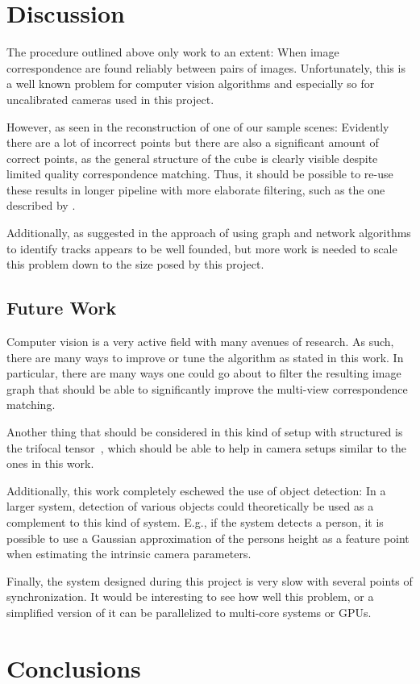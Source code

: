 \documentclass[preprint,acmtog]{acmart}
\begin{document}
\section{Discussion}

The procedure outlined above only work to an extent: When image correspondence
are found reliably between pairs of images. Unfortunately, this is a well known
problem for computer vision algorithms and especially so for uncalibrated
cameras used in this project.

However, as seen in the reconstruction of one of our sample scenes: Evidently
there are a lot of incorrect points but there are also a significant amount of
correct points, as the general structure of the cube is clearly visible despite
limited quality correspondence matching. Thus, it should be possible to re-use
these results in longer pipeline with more elaborate filtering, such as the one
described by \cite{ftc2016}.

Additionally, as suggested in \cite{wilson_iccv2013_disambig} the approach of
using graph and network algorithms to identify tracks appears to be well
founded, but more work is needed to scale this problem down to the size posed by
this project.


\subsection{Future Work}

Computer vision is a very active field with many avenues of research. As such,
there are many ways to improve or tune the algorithm as stated in this work. In
particular, there are many ways one could go about to filter the resulting image
graph that should be able to significantly improve the multi-view correspondence
matching.

Another thing that should be considered in this kind of setup with structured is
the trifocal tensor~\cite{Martyushev_2017}, which should be able to help in
camera setups similar to the ones in this work.

Additionally, this work completely eschewed the use of object detection: In a
larger system, detection of various objects could theoretically be used as a
complement to this kind of system. E.g., if the system detects a person, it is
possible to use a Gaussian approximation of the persons height as a feature
point when estimating the intrinsic camera parameters.

Finally, the system designed during this project is very slow with several
points of synchronization. It would be interesting to see how well this problem,
or a simplified version of it can be parallelized to multi-core systems or GPUs.


\section{Conclusions}



\begin{acks}
\end{acks}



\end{document}
